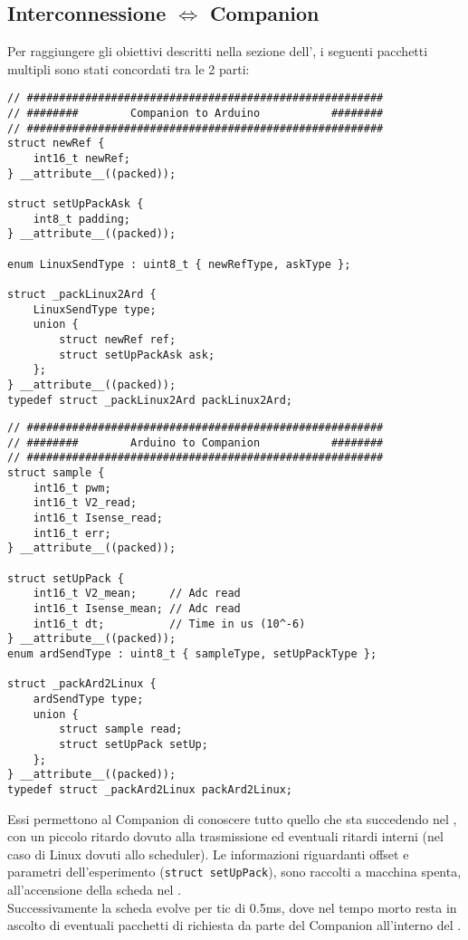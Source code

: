 \newpage
\subsection{Interconnessione \microControllore $\Leftrightarrow$ Companion}
Per raggiungere gli obiettivi descritti nella sezione dell', i seguenti pacchetti multipli sono stati concordati tra le 2 parti:
\begin{lstlisting}[style=cppStyle,caption={Pacchetti Companion $\Rightarrow$ \microControllore   },label=lst:Companion2ArdPack]
// #######################################################
// ########        Companion to Arduino           ########
// #######################################################
struct newRef {
	int16_t newRef;
} __attribute__((packed));

struct setUpPackAsk {
	int8_t padding;
} __attribute__((packed));

enum LinuxSendType : uint8_t { newRefType, askType };

struct _packLinux2Ard {
	LinuxSendType type;
	union {
		struct newRef ref;
		struct setUpPackAsk ask;
	};
} __attribute__((packed));
typedef struct _packLinux2Ard packLinux2Ard;
\end{lstlisting}

\begin{lstlisting}[style=cppStyle,caption={Pacchetti \microControllore $\Rightarrow$ Companion },label=lst:Ard2CompanionPack] 
// #######################################################
// ########        Arduino to Companion           ########
// #######################################################
struct sample {
	int16_t pwm;
	int16_t V2_read;
	int16_t Isense_read;
	int16_t err;
} __attribute__((packed));

struct setUpPack {
	int16_t V2_mean;     // Adc read
	int16_t Isense_mean; // Adc read
	int16_t dt;          // Time in us (10^-6)
} __attribute__((packed));
enum ardSendType : uint8_t { sampleType, setUpPackType };

struct _packArd2Linux {
	ardSendType type;
	union {
		struct sample read;
		struct setUpPack setUp;
	};
} __attribute__((packed));
typedef struct _packArd2Linux packArd2Linux;
\end{lstlisting}
\noindent
Essi permettono al Companion di conoscere tutto quello che sta succedendo nel \microC, con un piccolo ritardo dovuto alla trasmissione ed eventuali ritardi interni (nel caso di Linux dovuti allo scheduler).
Le informazioni riguardanti offset e parametri dell'esperimento (\verb|struct setUpPack|), sono raccolti a macchina spenta, all'accensione della scheda nel .\\
Successivamente la scheda evolve per tic di 0.5ms, dove nel tempo morto resta in ascolto di eventuali pacchetti di richiesta da parte del Companion all'interno del .\\

